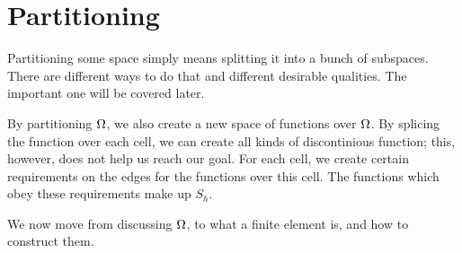 \section{Partitioning}
Partitioning some space simply means splitting it into a bunch of subspaces. 
There are different ways to do that and different desirable qualities. 
The important one will be covered later.

By partitioning $\Omega$, we also create a new space of functions over $\Omega$. 
By splicing the function over each cell, we can create all kinds of 
discontinious function; this, however, does not help us reach our goal. 
For each cell, we create certain requirements on the edges for the functions 
over this cell. The functions which obey these requirements make up $S_h$.




We now move from discussing $\Omega$, to what a finite element is,
and how to construct them.
